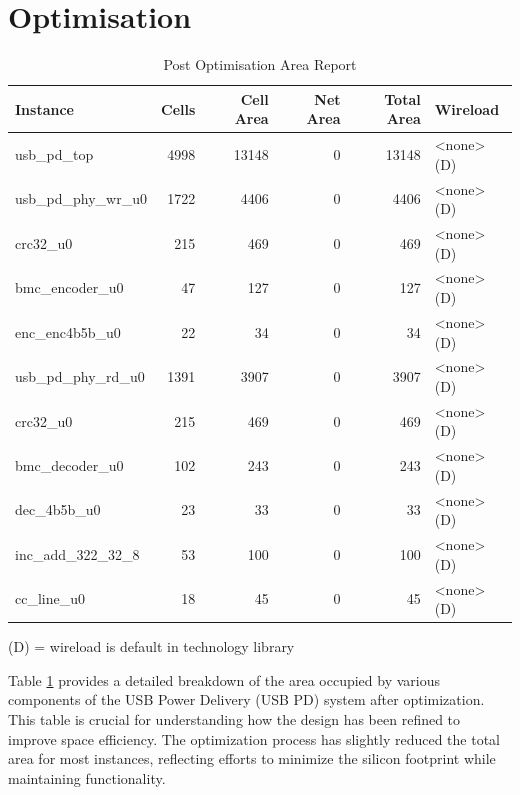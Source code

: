 \section{Optimisation}
\begin{table}[H]
\centering
\caption{Post Optimisation Area Report}
\begin{tabular}{|l|r|r|r|r|l|}
\hline
\textbf{Instance} & \textbf{Cells} & \textbf{Cell Area} & \textbf{Net Area} & \textbf{Total Area} & \textbf{Wireload} \\ \hline
usb\_pd\_top & 4998 & 13148 & 0 & 13148 & \textless none\textgreater (D) \\ \hline
\quad usb\_pd\_phy\_wr\_u0 & 1722 & 4406 & 0 & 4406 & \textless none\textgreater (D) \\ \hline
\quad \quad crc32\_u0 & 215 & 469 & 0 & 469 & \textless none\textgreater (D) \\ \hline
\quad \quad bmc\_encoder\_u0 & 47 & 127 & 0 & 127 & \textless none\textgreater (D) \\ \hline
\quad \quad enc\_enc4b5b\_u0 & 22 & 34 & 0 & 34 & \textless none\textgreater (D) \\ \hline
\quad usb\_pd\_phy\_rd\_u0 & 1391 & 3907 & 0 & 3907 & \textless none\textgreater (D) \\ \hline
\quad \quad crc32\_u0 & 215 & 469 & 0 & 469 & \textless none\textgreater (D) \\ \hline
\quad \quad bmc\_decoder\_u0 & 102 & 243 & 0 & 243 & \textless none\textgreater (D) \\ \hline
\quad \quad dec\_4b5b\_u0 & 23 & 33 & 0 & 33 & \textless none\textgreater (D) \\ \hline
inc\_add\_322\_32\_8 & 53 & 100 & 0 & 100 & \textless none\textgreater (D) \\ \hline
cc\_line\_u0 & 18 & 45 & 0 & 45 & \textless none\textgreater (D) \\ \hline
\end{tabular}

\label{table:area_syn_data}
\end{table}
(D) = wireload is default in technology library

Table \ref{table:area_syn_data} provides a detailed breakdown of the area occupied by various components of the USB Power Delivery (USB PD) system after optimization. This table is crucial for understanding how the design has been refined to improve space efficiency. The optimization process has slightly reduced the total area for most instances, reflecting efforts to minimize the silicon footprint while maintaining functionality.


